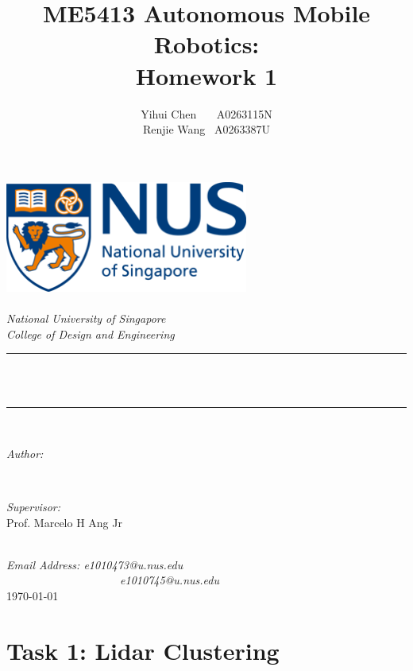 \documentclass[8pt]{article}
\title{ME5413 Autonomous Mobile Robotics: \\ Homework 1}
\author{\textup{Yihui Chen \ \ \ A0263115N \\ Renjie Wang \ A0263387U }}
\theoremstyle{nonumberplain}
\begin{document}
	\begin{titlepage}
		\center
		\newcommand{\HRule}{\rule{\linewidth}{0.5mm}}
		\includegraphics[width=8cm]{logo.png}\\[1cm] 
		\quad\\[2cm]
		\textsl{\Large National University of Singapore}\\[0.5cm] 
		\textsl{\large College of Design and Engineering}\\[0.5cm]
		\makeatletter
		\HRule \\[0.4cm]
		{ \huge \bfseries \@title}\\[0.4cm] 
		\HRule \\[2cm]
		\begin{minipage}{0.4\textwidth}
			\begin{flushleft} \large
				\emph{Author:}\\
				\@author 
			\end{flushleft}
		\end{minipage}
		~
		\begin{minipage}{0.4\textwidth}
			\begin{flushright} \large
				\emph{Supervisor:} \\
				\textup{Prof. Marcelo H Ang Jr}
			\end{flushright}
		\end{minipage}\\[3cm]
		\makeatother
		{\large \emph{Email Address: e1010473@u.nus.edu \\	\ \ \ \ \ \ \ \ \ \ \ \ \ \ \ \ \ \ \ \ e1010745@u.nus.edu}}\\[0.5cm]
		{\large \today}\\[2cm] 
		\vfill 
	\end{titlepage}

\section{Task 1: Lidar Clustering}

\hspace{1.0em}
\end{document}
